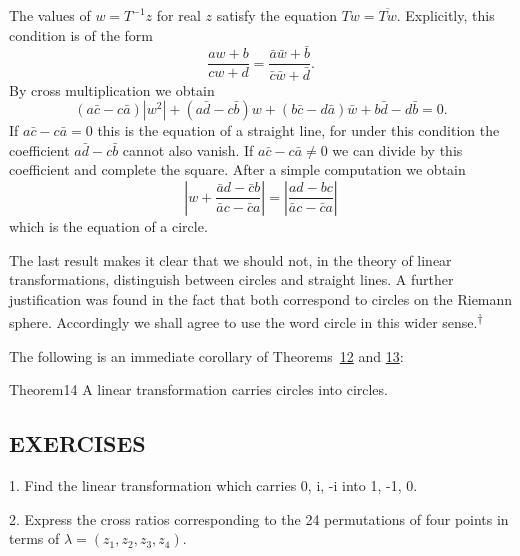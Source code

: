 The values of $w = T^{-1}z$ for real $z$ satisfy the equation $Tw = \overline{Tw}$. Explicitly, this condition is of the form
\begin{equation*}
\frac {a w + b}{c w + d} = \frac {\bar {a} \bar {w} + \bar {b}}{\bar {c} \bar {w} + \bar {d}}.
\end{equation*}
By cross multiplication we obtain
\begin{equation*}
(a \bar {c} - c \bar {a}) | w ^ {2} | + (a \bar {d} - c \bar {b}) w + (b \bar {c} - d \bar {a}) \bar {w} + b \bar {d} - d \bar {b} = 0.
\end{equation*}
If $a\bar{c} - c\bar{a} = 0$ this is the equation of a straight line, for under this condition the coefficient $a\bar{d} - c\bar{b}$ cannot also vanish. If $a\bar{c} - c\bar{a} \neq 0$ we can
divide by this coefficient and complete the square. After a simple computation we obtain
\begin{equation*}
\left| w + \frac {\bar {a} d - \bar {c} b}{\bar {a} c - \bar {c} a} \right| = \left| \frac {a d - b c}{\bar {a} c - \bar {c} a} \right|
\end{equation*}
which is the equation of a circle.

The last result makes it clear that we should not, in the theory of linear transformations, distinguish between circles and straight lines. A further justification was found in the fact that both correspond to circles on the Riemann sphere. Accordingly we shall agree to use the word circle in this wider sense.\hyperlink{fn:96:dagger}{\textsuperscript{\ensuremath{\dagger}}}

The following is an immediate corollary of Theorems~\hyperref[thm:3.12]{12} and \hyperref[thm:3.13]{13}:

\begin{originalstatement}{Theorem}{14}\label{thm:3.14}
A linear transformation carries circles into circles.
\end{originalstatement}
\subsection*{EXERCISES}
1. Find the linear transformation which carries 0, i, -i into 1, -1, 0.

2. Express the cross ratios corresponding to the 24 permutations of four points in terms of $\lambda = (z_{1}, z_{2}, z_{3}, z_{4})$.

